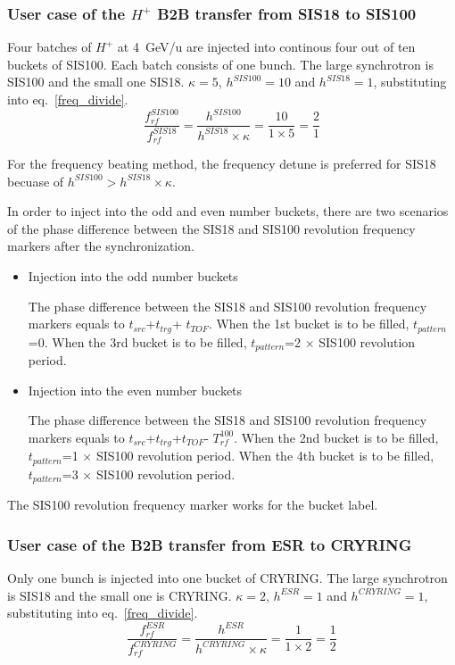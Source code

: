 \subsubsection{User case of the $H^{+}$ B2B transfer from SIS18 to SIS100}
Four batches of $H^{+}$ at \SI{4}{GeV/\atomicmassunit} are injected into continous four out of ten buckets of SIS100. Each batch consists of one bunch. The large synchrotron is SIS100 and the small one SIS18. $\kappa=5$, $h^{SIS100}=10$ and $h^{SIS18}=1$, substituting into eq.~\ref{freq_divide}.
\begin{equation}
\frac{f_{rf}^{SIS100}}{f_{rf}^{SIS18}}= \frac {h^{SIS100}}{h^{SIS18} \times \kappa}= \frac{10}{1 \times 5}=\frac{2}{1}
\end{equation}

For the frequency beating method, the frequency detune is preferred for SIS18 becuase of $h^{SIS100} > h^{SIS18} \times \kappa$.


In order to inject into the odd and even number buckets, there are two scenarios of the phase difference between the SIS18 and SIS100 revolution frequency markers after the synchronization.
\begin{itemize}
	\item Injection into the odd number buckets
		
		The phase difference between the SIS18 and SIS100 revolution frequency markers equals to $t_{src}$+$t_{trg}$+ $t_{TOF}$. When the 1st bucket is to be filled, $t_{pattern}$=0. When the 3rd bucket is to be filled, $t_{pattern}$=2 $\times$ SIS100 revolution period. 
	\item Injection into the even number buckets
	
		The phase difference between the SIS18 and SIS100 revolution frequency markers equals to $t_{src}$+$t_{trg}$+$t_{TOF}$- $T_{rf}^{100}$. When the 2nd bucket is to be filled, $t_{pattern}$=1 $\times$ SIS100 revolution period. When the 4th bucket is to be filled, $t_{pattern}$=3 $\times$ SIS100 revolution period. 

\end{itemize}

The SIS100 revolution frequency marker works for the bucket label.

\subsubsection{User case of the B2B transfer from ESR to CRYRING}
Only one bunch is injected into one bucket of CRYRING. The large synchrotron is SIS18 and the small one is CRYRING. $\kappa=2$, $h^{ESR}=1$ and $h^{CRYRING}=1$, substituting into eq.~\ref{freq_divide}. 
\begin{equation}
\frac{f_{rf}^{ESR}}{f_{rf}^{CRYRING}}= \frac {h^{ESR}}{h^{CRYRING} \times \kappa}= \frac{1}{1 \times 2}=\frac{1}{2}
\end{equation}

